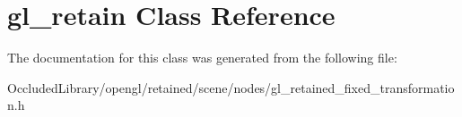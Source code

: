 \hypertarget{classgl__retain}{\section{gl\+\_\+retain Class Reference}
\label{classgl__retain}
}


The documentation for this class was generated from the following file\+:\begin{DoxyCompactItemize}
\item 
Occluded\+Library/opengl/retained/scene/nodes/gl\+\_\+retained\+\_\+fixed\+\_\+transformation.\+h\end{DoxyCompactItemize}
